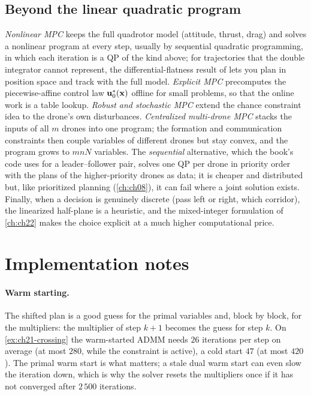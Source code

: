 \subsection{Beyond the linear quadratic program}

\emph{Nonlinear MPC} keeps the full quadrotor model (attitude, thrust,
drag) and solves a nonlinear program at every step, usually by sequential
quadratic programming, in which each iteration is a QP of the kind above;
for trajectories that the double integrator cannot represent, the
differential-flatness result of \textcite{mellinger2011minimum} lets you plan
in position space and track with the full model. \emph{Explicit MPC}
\cite{borrelli2017predictive} precomputes the piecewise-affine control law
$\mathbf{u}_0^{*}(\mathbf{x})$ offline for small problems, so that the online work is a
table lookup. \emph{Robust and stochastic MPC} \cite{rawlings2017mpc} extend
the chance constraint idea to the drone's own disturbances. \emph{Centralized
multi-drone MPC} stacks the inputs of all $m$ drones into one program; the
formation and communication constraints then couple variables of different
drones but stay convex, and the program grows to $mnN$ variables. The
\emph{sequential} alternative, which the book's code uses for a
leader--follower pair, solves one QP per drone in priority order with the
plans of the higher-priority drones as data; it is cheaper and distributed
but, like prioritized planning (\cref{ch:ch08}), it can fail where a joint
solution exists. Finally, when a decision is genuinely discrete (pass left or
right, which corridor), the linearized half-plane is a heuristic, and the
mixed-integer formulation of \cref{ch:ch22} makes the choice explicit at a
much higher computational price.

\section{Implementation notes}
\label{sec:ch21-implementation}

\paragraph{Warm starting.}
The shifted plan is a good guess for the primal variables and, block by
block, for the multipliers: the multiplier of step $k+1$ becomes the guess
for step $k$. On \cref{ex:ch21-crossing} the warm-started ADMM needs $26$
iterations per step on average (at most $280$, while the constraint is
active), a cold start $47$ (at most $420$). The primal warm start is what
matters; a stale dual warm start can even slow the iteration down, which is
why the solver resets the multipliers once if it has not converged after
$2\,500$ iterations.

